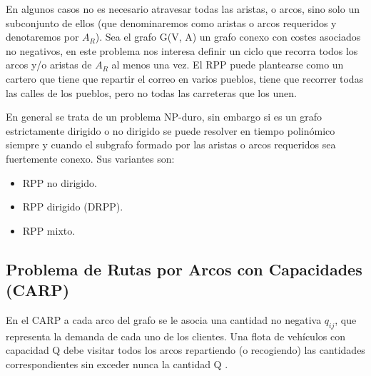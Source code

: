 En algunos casos no es necesario atravesar todas las aristas, o arcos, sino solo un subconjunto de ellos (que denominaremos como aristas o arcos requeridos y denotaremos por $A_R$). Sea el grafo G(V, A) un grafo conexo con costes asociados no negativos, en este problema nos interesa definir un ciclo que recorra todos los arcos y/o aristas de $A_R$ al menos una vez. El RPP puede plantearse como un cartero que tiene que repartir el correo en varios pueblos, tiene que recorrer todas las calles de los pueblos, pero no todas las carreteras que los unen.

En general se trata de un problema NP-duro, sin embargo si es un grafo estrictamente dirigido o no dirigido se puede resolver en tiempo polinómico siempre y cuando el subgrafo formado por las aristas o arcos requeridos sea fuertemente conexo. Sus variantes son:

\begin{itemize}
    \item RPP no dirigido.
    \item RPP dirigido (DRPP).
    \item RPP mixto.
\end{itemize}


\subsection{Problema de Rutas por Arcos con Capacidades (CARP)}

En el CARP a cada arco del grafo se le asocia una cantidad no negativa $q_{ij}$, que representa la demanda de cada uno de los clientes. Una flota de vehículos con capacidad Q debe visitar todos los arcos repartiendo (o recogiendo) las cantidades correspondientes sin exceder nunca la cantidad Q \citep{YordaPerez2014ElChino}.



